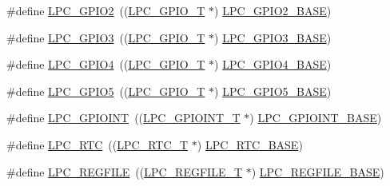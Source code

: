 \begin{DoxyCompactItemize}
\item 
\#define \hyperlink{group__PERIPH__177X__8X__BASE_ga27a09e8c08f9e209c6af70b0a3c56b39}{L\-P\-C\-\_\-\-G\-P\-I\-O2}~((\hyperlink{structLPC__GPIO__T}{L\-P\-C\-\_\-\-G\-P\-I\-O\-\_\-\-T}             $\ast$) \hyperlink{group__PERIPH__407X__8X__BASE_gae5524b2d728167194033ec7a1841a36b}{L\-P\-C\-\_\-\-G\-P\-I\-O2\-\_\-\-B\-A\-S\-E})
\item 
\#define \hyperlink{group__PERIPH__177X__8X__BASE_ga6e961eb01d0f1e61dd9b9d5979d2aafc}{L\-P\-C\-\_\-\-G\-P\-I\-O3}~((\hyperlink{structLPC__GPIO__T}{L\-P\-C\-\_\-\-G\-P\-I\-O\-\_\-\-T}             $\ast$) \hyperlink{group__PERIPH__407X__8X__BASE_ga56c68c5326b521b3278a35f4d81369a9}{L\-P\-C\-\_\-\-G\-P\-I\-O3\-\_\-\-B\-A\-S\-E})
\item 
\#define \hyperlink{group__PERIPH__177X__8X__BASE_ga652a560a972d4edec8a67cd85ad4bd60}{L\-P\-C\-\_\-\-G\-P\-I\-O4}~((\hyperlink{structLPC__GPIO__T}{L\-P\-C\-\_\-\-G\-P\-I\-O\-\_\-\-T}             $\ast$) \hyperlink{group__PERIPH__407X__8X__BASE_gaa54352e7745932e78b56bcbc1d70fa21}{L\-P\-C\-\_\-\-G\-P\-I\-O4\-\_\-\-B\-A\-S\-E})
\item 
\#define \hyperlink{group__PERIPH__177X__8X__BASE_gad41551ad62a13c91b7fff17e4340cb69}{L\-P\-C\-\_\-\-G\-P\-I\-O5}~((\hyperlink{structLPC__GPIO__T}{L\-P\-C\-\_\-\-G\-P\-I\-O\-\_\-\-T}             $\ast$) \hyperlink{group__PERIPH__407X__8X__BASE_gaf6bbc732156be98ff8a4d15fa7558ad6}{L\-P\-C\-\_\-\-G\-P\-I\-O5\-\_\-\-B\-A\-S\-E})
\item 
\#define \hyperlink{group__PERIPH__177X__8X__BASE_gaefe2f52407c1ce58395766dc760525b5}{L\-P\-C\-\_\-\-G\-P\-I\-O\-I\-N\-T}~((\hyperlink{structLPC__GPIOINT__T}{L\-P\-C\-\_\-\-G\-P\-I\-O\-I\-N\-T\-\_\-\-T}          $\ast$) \hyperlink{group__PERIPH__407X__8X__BASE_gadf88491f4b83b5af99eaf30778cb62fa}{L\-P\-C\-\_\-\-G\-P\-I\-O\-I\-N\-T\-\_\-\-B\-A\-S\-E})
\item 
\#define \hyperlink{group__PERIPH__177X__8X__BASE_ga8303d3e5135b2a039f0dc5f93c194f78}{L\-P\-C\-\_\-\-R\-T\-C}~((\hyperlink{structLPC__RTC__T}{L\-P\-C\-\_\-\-R\-T\-C\-\_\-\-T}              $\ast$) \hyperlink{group__PERIPH__407X__8X__BASE_ga4618213cf968f8245814d7d3e7aa2e2e}{L\-P\-C\-\_\-\-R\-T\-C\-\_\-\-B\-A\-S\-E})
\item 
\#define \hyperlink{group__PERIPH__177X__8X__BASE_ga2c74da31b7fd461d9b01e3241963f895}{L\-P\-C\-\_\-\-R\-E\-G\-F\-I\-L\-E}~((\hyperlink{structLPC__REGFILE__T}{L\-P\-C\-\_\-\-R\-E\-G\-F\-I\-L\-E\-\_\-\-T}          $\ast$) \hyperlink{group__PERIPH__407X__8X__BASE_gad2674eff10cea9243ab060ad1fbac9d2}{L\-P\-C\-\_\-\-R\-E\-G\-F\-I\-L\-E\-\_\-\-B\-A\-S\-E})

\end{DoxyCompactItemize}
